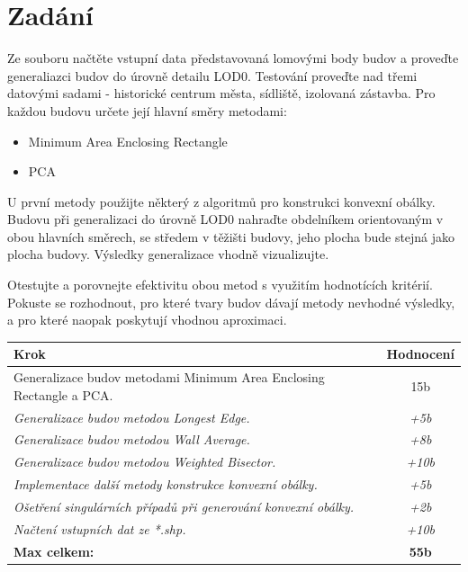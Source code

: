 \section{Zadání}
Ze souboru načtěte vstupní data představovaná lomovými body budov a proveďte generaliazci budov do úrovně detailu LOD0. Testování proveďte nad třemi datovými sadami - historické centrum města, sídliště, izolovaná zástavba.
\newline
Pro každou budovu určete její hlavní směry metodami: 
\begin{itemize}
    \item Minimum Area Enclosing Rectangle
    \item PCA
\end{itemize}


U první metody použijte některý z algoritmů pro konstrukci konvexní obálky. Budovu při generalizaci do úrovně LOD0 nahraďte obdelníkem orientovaným v obou hlavních směrech, se středem v těžišti budovy, jeho plocha bude stejná jako plocha budovy. Výsledky generalizace vhodně vizualizujte.


Otestujte a porovnejte efektivitu obou metod s využitím hodnotících kritérií. Pokuste se rozhodnout, pro které tvary budov dávají metody nevhodné výsledky, a pro které naopak poskytují vhodnou aproximaci.


\noindent
\begin{tabularx}{\textwidth}{|X|c|}
    \hline
    \textbf{Krok} & \textbf{Hodnocení} \\
    \hline\hline
    {Generalizace budov metodami Minimum Area Enclosing Rectangle a PCA.} \cellcolor[HTML]{94F29E} & 15b \\
    \hline
    \textit{Generalizace budov metodou Longest Edge.} \cellcolor[HTML]{94F29E} & \textit{+5b} \\
    \hline
    \textit{Generalizace budov metodou Wall Average.} \cellcolor[HTML]{94F29E} & \textit{+8b} \\
    \hline
    \textit{Generalizace budov metodou Weighted Bisector.} \cellcolor[HTML]{94F29E} & \textit{+10b} \\
    \hline
    \textit{Implementace další metody konstrukce konvexní obálky.} \cellcolor[HTML]{94F29E} & \textit{+5b} \\
    \hline
    \textit{Ošetření singulárních případů při generování konvexní obálky.} \cellcolor[HTML]{94F29E} & \textit{+2b} \\
    \hline
  
    \hline
    \textit{Načtení vstupních dat ze *.shp.} \cellcolor[HTML]{94F29E} & \textit{+10b} \\
    \hline
    \textbf{Max celkem:} & \textbf{55b} \\
    \hline
\end{tabularx}


